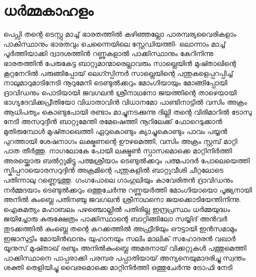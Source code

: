 \section{ധർമ്മകാഹളം}
\obeylines
\noindent
പെപ്സി തന്റെ ടെസ്റ്റു മാച്ച്
ഭാരതത്തിൽ കഴിഞ്ഞല്ലോ
പാരമ്പര്യവൈരികളാം 
പാകിസ്ഥാനും ഭാരതവും
ചെന്നൈയിലെ സ്റ്റേഡിയത്തി-
ലൊന്നാം മാച്ച് പൂർത്തിയാക്കി
ദ്വാദശത്തിൻ റണ്ണുകളാൽ
പാക്കിസ്ഥാനും കേറിനിന്നു
ഭാരതത്തിൻ പേരുകേട്ട
ബാറ്റുമാന്മാരെല്ലാവരും
സാഖ്ലെയിൻ മുഷ്താഖിന്റെ
കൂറ്റനേറിൽ പരുങ്ങിപ്പോയ്
ലെഗ്സ്പിന്നർ സാഖ്ലെയിന്റെ
പന്തുകളെപ്പറപ്പിച്ച്
നാലുമാറുമാടിനേടി
നൂറുമേനി ടെണ്ടുൽക്കറും
മോംഗിയായും മോങ്ങിപ്പോയി
ദ്രാവിഡനും പൊടിയായി
ജവഗലൻ ശ്രീനാഥനോ
ജയത്തിന്റെ താഴെയായി
ഭാഗ്യദേവിക്കപ്രീതിയോ
വിധാതാവിൻ വിധാനമോ
പാണ്ടിനാട്ടിൽ വസിം അക്രം
ആധിപത്യം കൊണ്ടുപോയി
രണ്ടാം മാച്ചുനടക്കുന്നു
ദില്ലി തന്റെ വിരിമാറിൽ
ടോസു നേടി അസറുദ്ദീൻ
ബാറ്റുമേന്തി രമേഷെത്തി
നൂറിലേക്ക് ഫോറെടുക്കാൻ
മുതിരുമ്പോൾ മുഷ്താഖെത്തി
ഏറുകൊണ്ടും ക്യാച്ചുകൊണ്ടും
പാവം പയ്യൻ പുറത്തായി
ശേഷനാഗം ലക്ഷ്മണന്റെ
ഊഴമെത്തി, വസിം അക്രം
സ്റ്റമ്പ് മാറ്റി പാത തീർത്തു.
നാഗലോകേ പോയി ലക്ഷ്മൺ
സ്പാസമൊക്കെ മാറ്റിനിർത്തി 
അരയ്ക്കൊരു ബൽറ്റുമിട്ടു
പത്മശ്രീയാം ടെണ്ടുൽക്കറും
പത്മപാദർ പോലെയെത്തി
സ്കിപ്പറായൊരസറുദ്ദിൻ
അക്രമിന്റെ പന്തുകളിൽ
ബാറ്റുവീശി ചീറ്റലോടെ
പതിന്നാലു റണ്ണെടുത്തു.
ഗംഗപോലെ ഗാംഗുലിയും
കാവേരിതൻ ദ്രാവിഡനും
നർമ്മദയാം ടെണ്ടുൽക്കറും
ഒത്തുചേർന്നു റണ്ണുയർത്തി
മോംഗിയായൊ പൂജ്യനായി
അനിൽ കുംബ്ലെ പതിനഞ്ചു
ജവഗലൻ ശ്രീനാഥനൊ
ജയക്കൊടിയേന്തിനിന്നു.
ഐകമത്യം മഹാബലം
പഴഞ്ചൊല്ലിൽ പതിരില്ല
ഇന്ദ്രപ്രസ്ഥം ധർമ്മയുദ്ധം
ജയിച്ചോരു കുരുക്ഷേത്രം
പാക്കിസ്ഥാന്റെ ബാറ്റിങ്ങിലോ 
സയ്യിദ് അൻവർ തുടക്കത്തിൽ
കുംബ്ലെ തന്റെ കറക്കത്തിൽ
അഫ്രീദിയും ഔട്ടായി
ഇൻസമാമും ഇജാസുട്ടിം
മോയിൻഖാനും യുഹാനയും
സലിം മാലിക് സഹോദരൻ
വഖാർ യൂനുസ് മുഷ്താഖ് രണ്ടും
അനിൽകുംബ്ലെ അമരനായ്
വിക്കറ്റുകൾ പത്തുമെത്തി
പാക്കിസ്ഥാനെ പാപ്പരാക്കി
പരമ്പര പപ്പാതിയായ്
അന്യനെയുമാദരിച്ചു
സ്വന്തം ശക്തി തെളിയിച്ചു
വൈരമൊക്കെ മാറ്റിനിർത്തി
ഒത്തുചേർന്നു ട്രോഫി നേടി
